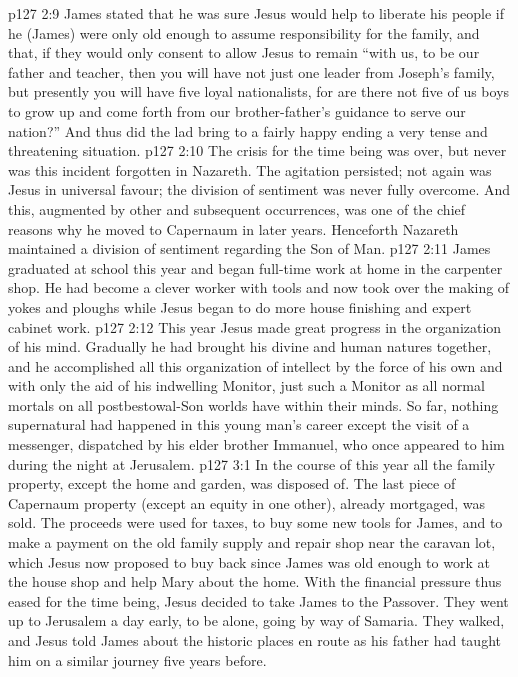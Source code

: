 \vs p127 2:9 James stated that he was sure Jesus would help to liberate his people if he (James) were only old enough to assume responsibility for the family, and that, if they would only consent to allow Jesus to remain “with us, to be our father and teacher, then you will have not just one leader from Joseph’s family, but presently you will have five loyal nationalists, for are there not five of us boys to grow up and come forth from our brother\hyp{}father’s guidance to serve our nation?” And thus did the lad bring to a fairly happy ending a very tense and threatening situation.
\vs p127 2:10 The crisis for the time being was over, but never was this incident forgotten in Nazareth. The agitation persisted; not again was Jesus in universal favour; the division of sentiment was never fully overcome. And this, augmented by other and subsequent occurrences, was one of the chief reasons why he moved to Capernaum in later years. Henceforth Nazareth maintained a division of sentiment regarding the Son of Man.
\vs p127 2:11 \pc James graduated at school this year and began full\hyp{}time work at home in the carpenter shop. He had become a clever worker with tools and now took over the making of yokes and ploughs while Jesus began to do more house finishing and expert cabinet work.
\vs p127 2:12 \pc This year Jesus made great progress in the organization of his mind. Gradually he had brought his divine and human natures together, and he accomplished all this organization of intellect by the force of his own  and with only the aid of his indwelling Monitor, just such a Monitor as all normal mortals on all postbestowal\hyp{}Son worlds have within their minds. So far, nothing supernatural had happened in this young man’s career except the visit of a messenger, dispatched by his elder brother Immanuel, who once appeared to him during the night at Jerusalem.
\vs p127 3:1 In the course of this year all the family property, except the home and garden, was disposed of. The last piece of Capernaum property (except an equity in one other), already mortgaged, was sold. The proceeds were used for taxes, to buy some new tools for James, and to make a payment on the old family supply and repair shop near the caravan lot, which Jesus now proposed to buy back since James was old enough to work at the house shop and help Mary about the home. With the financial pressure thus eased for the time being, Jesus decided to take James to the Passover. They went up to Jerusalem a day early, to be alone, going by way of Samaria. They walked, and Jesus told James about the historic places en route as his father had taught him on a similar journey five years before.
